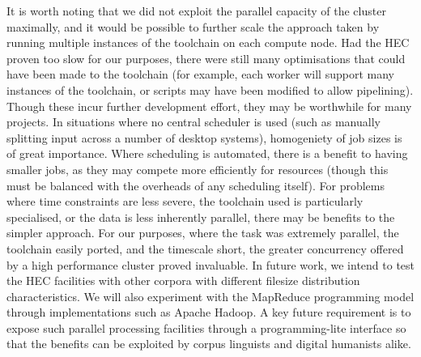 It is worth noting that we did not exploit the parallel capacity of the cluster maximally, and it would be possible to further scale the approach taken by running multiple instances of the toolchain on each compute node. 
Had the HEC proven too slow for our purposes, there were still many optimisations that could have been made to the toolchain (for example, each worker will support many instances of the toolchain, or scripts may have been modified to allow pipelining).  Though these incur further development effort, they may be worthwhile for many projects.
In situations where no central scheduler is used (such as manually splitting input across a number of desktop systems), homogeniety of job sizes is of great importance.  Where scheduling is automated, there is a benefit to having smaller jobs, as they may compete more efficiently for resources (though this must be balanced with the overheads of any scheduling itself).
For problems where time constraints are less severe, the toolchain used is particularly specialised, or the data is less inherently parallel, there may be benefits to the simpler approach.  For our purposes, where the task was extremely parallel, the toolchain easily ported, and the timescale short, the greater concurrency offered by a high performance cluster proved invaluable.  
In future work, we intend to test the HEC facilities with other corpora with different filesize distribution characteristics. We will also experiment with the MapReduce programming model through implementations such as Apache Hadoop. A key future requirement is to expose such parallel processing facilities through a programming-lite interface so that the benefits can be exploited by corpus linguists and digital humanists alike.











